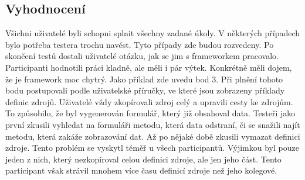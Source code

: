 \subsection{Vyhodnocení}
Všichni uživatelé byli schopni splnit všechny zadané úkoly. V některých případech bylo potřeba testera trochu navést. Tyto případy zde budou rozvedeny. Po skončení testů dostali uživatelé otázku, jak se jim s frameworkem pracovalo. Participanti hodnotili práci kladně, ale měli i pár výtek. Konkrétně měli dojem, že je framework moc chytrý. Jako příklad zde uvedu bod 3. Při plnění tohoto bodu postupovali podle uživatelské příručky, ve které jsou zobrazeny příklady definic zdrojů. Uživatelé vždy zkopírovali zdroj celý a upravili cesty ke zdrojům. To způsobilo, že byl vygenerován formulář, který již obsahoval data. Testeři jako první zkusili vyhledat na formuláři metodu, která data odstraní, či se snažili najít metodu, která zakáže zobrazování dat. Až po nějaké době zkusili vymazat definici zdroje. Tento problém se vyskytl téměř u všech participantů. Výjimkou byl pouze jeden z nich, který nezkopíroval celou definici zdroje, ale jen jeho část. Tento participant však strávil mnohem více času definicí zdroje než jeho kolegové.

